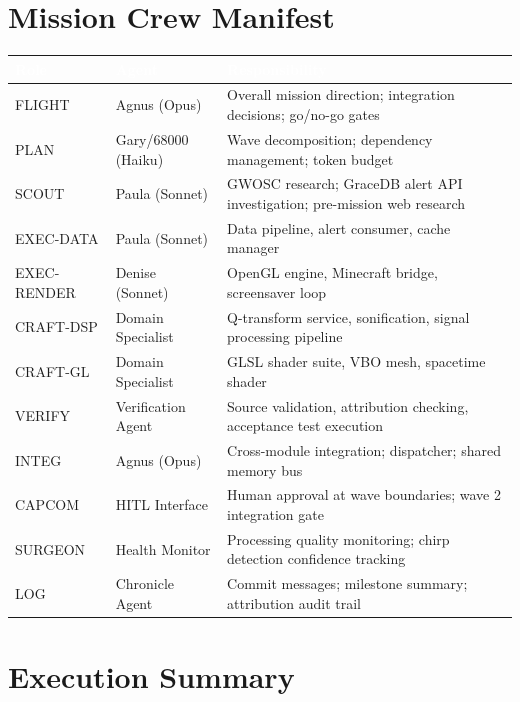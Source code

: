 \documentclass[11pt,letterpaper]{article}
\newcommand{\tableheader}[1]{\textbf{\sffamily\textcolor{white}{#1}}}
\begin{document}
\section{Mission Crew Manifest}

\begin{center}
\begin{tabularx}{\textwidth}{L{2cm}L{3cm}X}
\toprule
{}
\tableheader{Role} & \tableheader{Agent} & \tableheader{Responsibility} \\
\midrule
FLIGHT & Agnus (Opus) & Overall mission direction; integration decisions; go/no-go gates \\
PLAN & Gary/68000 (Haiku) & Wave decomposition; dependency management; token budget \\
SCOUT & Paula (Sonnet) & GWOSC research; GraceDB alert API investigation; pre-mission web research \\
EXEC-DATA & Paula (Sonnet) & Data pipeline, alert consumer, cache manager \\
EXEC-RENDER & Denise (Sonnet) & OpenGL engine, Minecraft bridge, screensaver loop \\
CRAFT-DSP & Domain Specialist & Q-transform service, sonification, signal processing pipeline \\
CRAFT-GL & Domain Specialist & GLSL shader suite, VBO mesh, spacetime shader \\
VERIFY & Verification Agent & Source validation, attribution checking, acceptance test execution \\
INTEG & Agnus (Opus) & Cross-module integration; dispatcher; shared memory bus \\
CAPCOM & HITL Interface & Human approval at wave boundaries; wave 2 integration gate \\
SURGEON & Health Monitor & Processing quality monitoring; chirp detection confidence tracking \\
LOG & Chronicle Agent & Commit messages; milestone summary; attribution audit trail \\
\bottomrule
\end{tabularx}
\end{center}

\section{Execution Summary}
\end{document}
